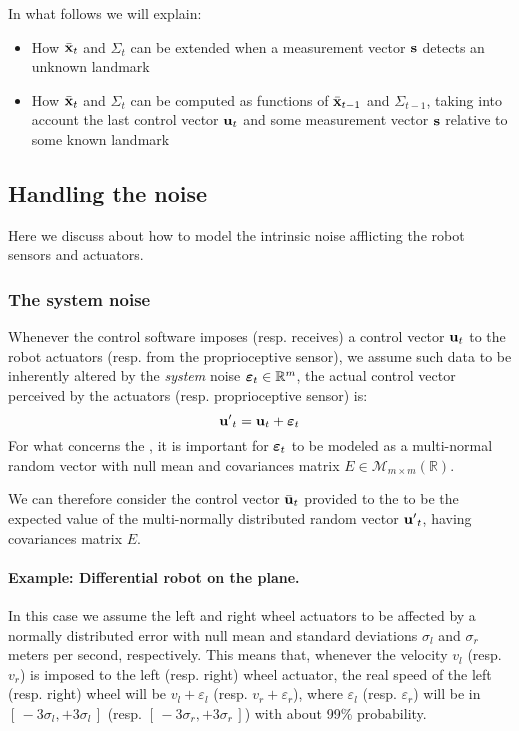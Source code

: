 		In what follows we will explain:
		\begin{itemize}
			\item How $\bar{\boldsymbol{\mathrm{{x}}}}_t$ and $\Sigma_t$ can be extended when a measurement vector $\boldsymbol{\mathrm{{s}}}$ detects an unknown landmark
			\item How $\bar{\boldsymbol{\mathrm{{x}}}}_t$ and $\Sigma_t$ can be computed as functions of $\bar{\boldsymbol{\mathrm{{x}}}}_{t-1}$ and $\Sigma_{t-1}$, taking into account the last control vector $\boldsymbol{\mathrm{{u}}}_t$ and some measurement vector $\boldsymbol{\mathrm{{s}}}$ relative to some known landmark
		\end{itemize}
		
\subsection{Handling the noise}
	Here we discuss about how to model the intrinsic noise afflicting the robot sensors and actuators.
	
	\subsubsection{The system noise}
		Whenever the control software imposes (resp. receives) a control vector $\boldsymbol{\mathrm{{u}}}_t$ to the robot actuators (resp. from the proprioceptive sensor), we assume such data to be inherently altered by the \emph{system} noise $\boldsymbol{\mathrm{{\varepsilon}}}_t \in \mathbb{R}^m$, \ie{} the actual control vector perceived by the actuators (resp. proprioceptive sensor) is:
		\[
			{\boldsymbol{\mathrm{{u}}}'}_t = \boldsymbol{\mathrm{{u}}}_t + \boldsymbol{\mathrm{{\varepsilon}}}_t
		\]
		For what concerns the \EKF{}, it is important for $\boldsymbol{\mathrm{{\varepsilon}}}_t$ to be modeled as a multi-normal random vector with null mean and covariances matrix $E \in \mathcal{M}_{m \times m}(\mathbb{R})$.
		
		We can therefore consider the control vector $\bar{\boldsymbol{\mathrm{{u}}}}_t$ provided to the \EKF{} to be the expected value of the multi-normally distributed random vector ${\boldsymbol{\mathrm{{u}}}'}_t$, having covariances matrix $E$.
		
		\paragraph{Example: Differential robot on the plane.}
			In this case we assume the left and right wheel actuators to be affected by a normally distributed error with null mean and standard deviations $\sigma_l$ and $\sigma_r$ meters per second, respectively.
			This means that, whenever the velocity $v_l$ (resp. $v_r$) is imposed to the left (resp. right) wheel actuator, the real speed of the left (resp. right) wheel will be $v_l + \varepsilon_l$ (resp. $v_r + \varepsilon_r$), where $\varepsilon_l$ (resp. $\varepsilon_r$) will be in $[\, -3\sigma_l, +3\sigma_l \,]$ (resp. $[\, -3\sigma_r, +3\sigma_r \,]$) with about 99\% probability.
			
